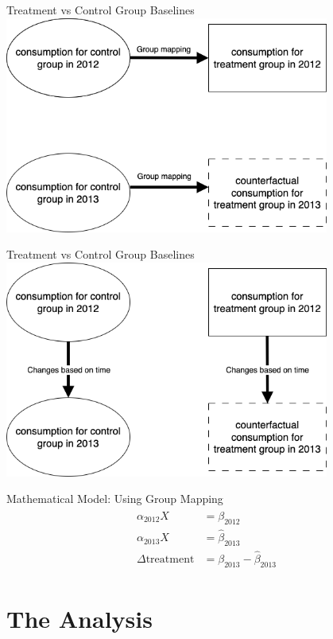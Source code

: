 \documentclass{beamer}
\begin{document}
\begin{frame}{Treatment vs Control Group Baselines}
  \centering
  \includegraphics[width=0.8\textwidth]{images/group-mapping.png}
\end{frame}

\begin{frame}{Treatment vs Control Group Baselines}
  \centering
  \includegraphics[width=0.8\textwidth]{images/yoy-mapping.png}
\end{frame}

\begin{frame}{Mathematical Model: Using Group Mapping}
  \begin{align}
    \begin{split}
        \alpha_{2012} X &= \beta_{2012} \\
        \alpha_{2013} X &= \hat\beta_{2013} \\
        \Delta\mbox{treatment} &= \beta_{2013} - \hat\beta_{2013}
    \end{split}
  \end{align}
\end{frame}

\section{The Analysis}
\end{document}
